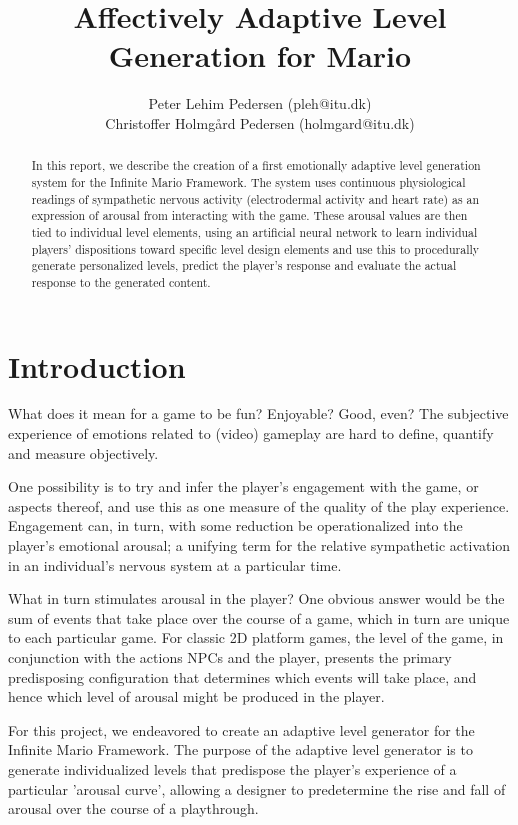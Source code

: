 \documentclass{llncs}
\begin{document}
\title{Affectively Adaptive Level Generation for Mario}
\author{Peter Lehim Pedersen (pleh@itu.dk) \\Christoffer Holmg{\aa}rd Pedersen (holmgard@itu.dk)}
\maketitle
\begin{abstract}
In this report, we describe the creation of a first emotionally adaptive level generation system for the Infinite Mario Framework. The system uses continuous physiological readings of sympathetic nervous activity (electrodermal activity and heart rate) as an expression of arousal from interacting with the game.
These arousal values are then tied to individual level elements, using an artificial neural network to learn individual players' dispositions toward specific level design elements and use this to procedurally generate personalized levels, predict the player's response and evaluate the actual response to the generated content.
\end{abstract}
\section{Introduction}
What does it mean for a game to be fun? Enjoyable? Good, even? The subjective experience of emotions related to (video) gameplay are hard to define, quantify and measure objectively.

One possibility is to try and infer the player's engagement with the game, or aspects thereof, and use this as one measure of the quality of the play experience.
Engagement can, in turn, with some reduction be operationalized into the player's emotional arousal; a unifying term for the relative sympathetic activation in an individual's nervous system at a particular time.

What in turn stimulates arousal in the player? One obvious answer would be the sum of events that take place over the course of a game, which in turn are unique to each particular game. For classic 2D platform games, the level of the game, in conjunction with the actions NPCs and the player, presents the primary predisposing configuration that determines which events will take place, and hence which level of arousal might be produced in the player.

For this project, we endeavored to create an adaptive level generator for the Infinite Mario Framework. The purpose of the adaptive level generator is to generate individualized levels that predispose the player's experience of a particular 'arousal curve', allowing a designer to predetermine the rise and fall of arousal over the course of a playthrough.
\end{document}
